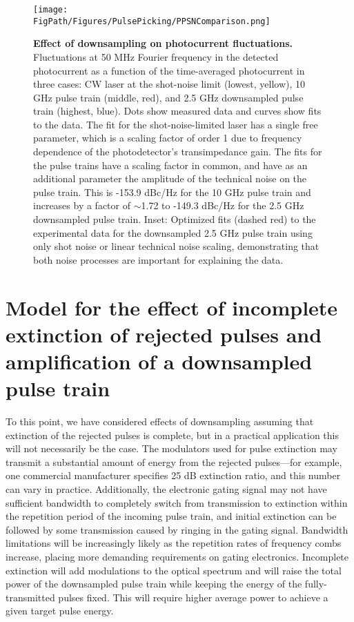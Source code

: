 \begin{figure}[htpb]
	\begin{center}
		\texttt{[image: \\FigPath/Figures/PulsePicking/PPSNComparison.png]}
	\end{center}
	\caption[Effect of downsampling on photocurrent fluctuations]{\textbf{Effect of downsampling on photocurrent fluctuations.} Fluctuations at 50 MHz Fourier frequency in the detected photocurrent as a function of the time-averaged photocurrent in three cases: CW laser at the shot-noise limit (lowest, yellow), 10 GHz pulse train (middle, red), and 2.5 GHz downsampled pulse train (highest, blue). Dots show measured data and curves show fits to the data. The fit for the shot-noise-limited laser has a single free parameter, which is a scaling factor of order 1 due to frequency dependence of the photodetector's transimpedance gain. The fits for the pulse trains have a scaling factor in common, and have as an additional parameter the amplitude of the technical noise on the pulse train. This is -153.9 dBc/Hz for the 10 GHz pulse train and increases by a factor of $\sim$1.72 to -149.3 dBc/Hz for the 2.5 GHz downsampled pulse train. Inset: Optimized fits (dashed red) to the experimental data for the downsampled 2.5 GHz pulse train using only shot noise or linear technical noise scaling, demonstrating that both noise processes are important for explaining the data. }
	\label{fig:PPSNComparison}
\end{figure} 

\section{Model for the effect of incomplete extinction of rejected pulses and amplification of a downsampled pulse train}\label{sec:PPAmplification}
To this point, we have considered effects of downsampling assuming that extinction of the rejected pulses is complete, but in a practical application this will not necessarily be the case.  The modulators used for pulse extinction may transmit a substantial amount of energy from the rejected pulses---for example, one commercial manufacturer specifies 25 dB extinction ratio, and this number can vary in practice. Additionally, the electronic gating signal may not have sufficient bandwidth to completely switch from transmission to extinction within the repetition period of the incoming pulse train, and initial extinction can be followed by some transmission caused by ringing in the gating signal. Bandwidth limitations will be increasingly likely as the repetition rates of frequency combs increase, placing more demanding requirements on gating electronics.  Incomplete extinction will add modulations to the optical spectrum and will raise the total power of the downsampled pulse train while keeping the energy of the fully-transmitted pulses fixed. This will require higher average power to achieve a given target pulse energy.


